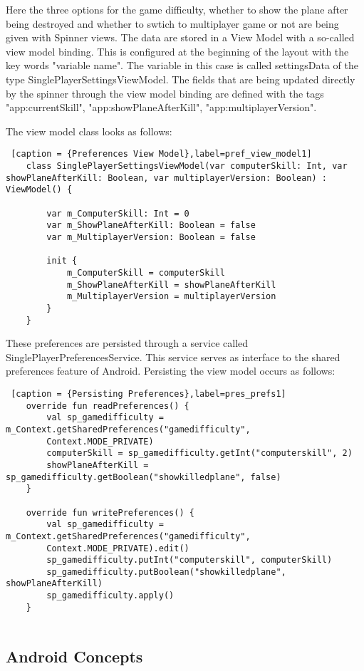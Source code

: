Here the three options for the game difficulty, whether to show the plane after being destroyed and whether to swtich to multiplayer game or not are being given with Spinner views. The data are stored in a View Model with a so-called view model binding. This is configured at the beginning of the layout with the key words "variable name". The variable in this case is called settingsData of the type SinglePlayerSettingsViewModel. The fields that are being updated directly by the spinner through the view model binding are defined with the tags "app:currentSkill", "app:showPlaneAfterKill", "app:multiplayerVersion". 

The view model class looks as follows:

\begin{lstlisting} [caption = {Preferences View Model},label=pref_view_model1]
	class SinglePlayerSettingsViewModel(var computerSkill: Int, var showPlaneAfterKill: Boolean, var multiplayerVersion: Boolean) : ViewModel() {
		
		var m_ComputerSkill: Int = 0
		var m_ShowPlaneAfterKill: Boolean = false
		var m_MultiplayerVersion: Boolean = false
		
		init {
			m_ComputerSkill = computerSkill
			m_ShowPlaneAfterKill = showPlaneAfterKill
			m_MultiplayerVersion = multiplayerVersion
		}
	}
\end{lstlisting}

These preferences are persisted through a service called SinglePlayerPreferencesService. This service serves as interface to the shared preferences feature of Android. Persisting the view model occurs as follows:

\begin{lstlisting} [caption = {Persisting Preferences},label=pres_prefs1]
	override fun readPreferences() {
		val sp_gamedifficulty = m_Context.getSharedPreferences("gamedifficulty",
		Context.MODE_PRIVATE)
		computerSkill = sp_gamedifficulty.getInt("computerskill", 2)
		showPlaneAfterKill = sp_gamedifficulty.getBoolean("showkilledplane", false)
	}
	
	override fun writePreferences() {
		val sp_gamedifficulty = m_Context.getSharedPreferences("gamedifficulty",
		Context.MODE_PRIVATE).edit()
		sp_gamedifficulty.putInt("computerskill", computerSkill)
		sp_gamedifficulty.putBoolean("showkilledplane", showPlaneAfterKill)
		sp_gamedifficulty.apply()
	}
	
\end{lstlisting}

\subsection { Android Concepts }

